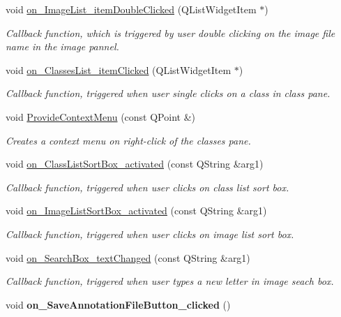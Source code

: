 \begin{DoxyCompactItemize}
void \hyperlink{classMainView_ae0af943bbf0d0806261bb8aa5444eb5b}{on\+\_\+\+Image\+List\+\_\+item\+Double\+Clicked} (Q\+List\+Widget\+Item $\ast$)
\begin{DoxyCompactList}\small\item\em Callback function, which is triggered by user double clicking on the image file name in the image pannel. \end{DoxyCompactList}\item 
void \hyperlink{classMainView_a2970c289fed50a4d86051135af81ba61}{on\+\_\+\+Classes\+List\+\_\+item\+Clicked} (Q\+List\+Widget\+Item $\ast$)
\begin{DoxyCompactList}\small\item\em Callback function, triggered when user single clicks on a class in class pane. \end{DoxyCompactList}\item 
void \hyperlink{classMainView_aa9d5f1300bd6b2524f611873d68c938b}{Provide\+Context\+Menu} (const Q\+Point \&)
\begin{DoxyCompactList}\small\item\em Creates a context menu on right-\/click of the classes pane. \end{DoxyCompactList}\item 
void \hyperlink{classMainView_acf443010a1d872e9260e174a9311a1a0}{on\+\_\+\+Class\+List\+Sort\+Box\+\_\+activated} (const Q\+String \&arg1)
\begin{DoxyCompactList}\small\item\em Callback function, triggered when user clicks on class list sort box. \end{DoxyCompactList}\item 
void \hyperlink{classMainView_a682bc17938f71ec37ba9485fb3a0f71b}{on\+\_\+\+Image\+List\+Sort\+Box\+\_\+activated} (const Q\+String \&arg1)
\begin{DoxyCompactList}\small\item\em Callback function, triggered when user clicks on image list sort box. \end{DoxyCompactList}\item 
void \hyperlink{classMainView_ae8529f73ea1db1a678c9730495b444a9}{on\+\_\+\+Search\+Box\+\_\+text\+Changed} (const Q\+String \&arg1)
\begin{DoxyCompactList}\small\item\em Callback function, triggered when user types a new letter in image seach box. \end{DoxyCompactList}\item 
\mbox{\label{classMainView_a794221873e8dfab91659bfa088c6fa08}} 
void {\bfseries on\+\_\+\+Save\+Annotation\+File\+Button\+\_\+clicked} ()
\end{DoxyCompactItemize}
